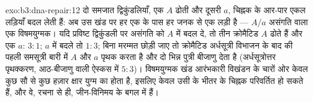 \begin{solution}{exo:b3:dna-repair:12}
दो समजात द्विकुंडलियाँ, एक $A$ ढोती और दूसरी $a$, चिह्नक के आर-पार
एकल लड़ियाँ बदल लेती हैं: अब उस खंड पर हर एक के पास हर जनक से एक लड़ी
है --- $A/a$ असंगति वाला एक विषमयुग्मक। यदि  प्रविष्ट
द्विकुंडली पर असंगति को $A$ में बदल दे, तो तीन क्रोमैटिड $A$ ढोते हैं
और एक $a$: $3{:}1$; $a$ में बदले तो $1{:}3$; बिना मरम्मत छोड़ी जाए तो
क्रोमैटिड अर्धसूत्री विभाजन के बाद की पहली समसूत्री बारी में $A$ और
$a$ पृथक करता है और दो भिन्न पुत्री बीजाणु देता है (अर्धसूत्रोत्तर
पृथक्करण, आठ-बीजाणु वाली ऐस्कस में $5{:}3$)। विषमयुग्मक खंड आरंभकारी
विखंडन के चारों ओर केवल कुछ सौ से कुछ हज़ार क्षार युग्म का होता है,
इसलिए केवल उसी के भीतर के चिह्नक परिवर्तित हो सकते हैं, और वे, रचना से
ही, जीन-विनिमय के बगल में हैं।
\end{solution}

